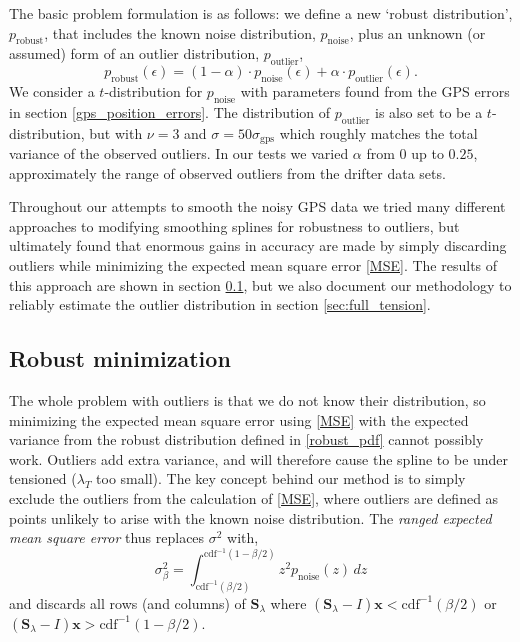 \documentclass{ametsoc}
\begin{document}
The basic problem formulation is as follows: we define a new `robust distribution', $p_{\textrm{robust}}$, that includes the known noise distribution, $p_{\textrm{noise}}$, plus an unknown (or assumed) form of an outlier distribution, $p_{\textrm{outlier}}$,
\begin{equation}
\label{robust_pdf}
    p_{\textrm{robust}}(\epsilon) = (1-\alpha) \cdot p_{\textrm{noise}}(\epsilon) + \alpha \cdot  p_{\textrm{outlier}}(\epsilon).
\end{equation}
We consider
a $t$-distribution for $p_{\textrm{noise}}$ with parameters found from the GPS errors in section \ref{gps_position_errors}. The distribution of $ p_{\textrm{outlier}}$ is also set to be a $t$-distribution, but with $\nu=3$ and $\sigma=50\sigma_\textrm{gps}$ which roughly matches the total variance of the observed outliers. In our tests we varied $\alpha$ from 0 up to $0.25$, approximately the range of observed outliers from the drifter data sets.

Throughout our attempts to smooth the noisy GPS data we tried many different approaches to modifying smoothing splines for robustness to outliers, but ultimately found that enormous gains in accuracy are made by simply discarding outliers while minimizing the expected mean square error \eqref{MSE}. The results of this approach are shown in section \ref{sec:robust_minimization}, but we also document our methodology to reliably estimate the outlier distribution in section \ref{sec:full_tension}.

\subsection{Robust minimization}
\label{sec:robust_minimization}

The whole problem with outliers is that we do not know their distribution, so minimizing the expected mean square error using \eqref{MSE} with the expected variance from the robust distribution defined in \eqref{robust_pdf} cannot possibly work. Outliers add extra variance, and will therefore cause the spline to be under tensioned ($\lambda_T$ too small). The key concept behind our method is to simply exclude the outliers from the calculation of \eqref{MSE}, where outliers are defined as points unlikely to arise with the known noise distribution. The \emph{ranged expected mean square error} thus replaces $\sigma^2$ with,
\begin{equation}
\label{ranged_mse}
    \sigma_\beta^2 = \int_{\textrm{cdf}^{-1}(\beta/2)}^{\textrm{cdf}^{-1}(1-\beta/2)} z^2 p_{\textrm{noise}}(z) \, dz
\end{equation}
and discards all rows (and columns) of $\mathbf{S}_\lambda$ where $\left(\mathbf{S}_\lambda - I\right)\mathbf{x}<\textrm{cdf}^{-1}(\beta/2)$ or $\left(\mathbf{S}_\lambda - I\right)\mathbf{x}>\textrm{cdf}^{-1}(1-\beta/2)$.
\end{document}

